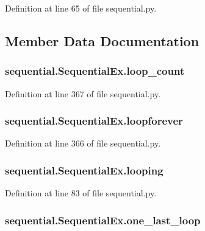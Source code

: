 Definition at line 65 of file sequential.\-py.



\subsection{Member Data Documentation}
\hypertarget{classsequential_1_1SequentialEx_a4ba41b6f01a147966df8df335d570d22}{
\subsubsection[{loop\-\_\-count}]{\setlength{\rightskip}{0pt plus 5cm}sequential.\-Sequential\-Ex.\-loop\-\_\-count}}\label{classsequential_1_1SequentialEx_a4ba41b6f01a147966df8df335d570d22}


Definition at line 367 of file sequential.\-py.

\hypertarget{classsequential_1_1SequentialEx_a8cf719781ed7aa81bb27e30d4281cb66}{
\subsubsection[{loopforever}]{\setlength{\rightskip}{0pt plus 5cm}sequential.\-Sequential\-Ex.\-loopforever}}\label{classsequential_1_1SequentialEx_a8cf719781ed7aa81bb27e30d4281cb66}


Definition at line 366 of file sequential.\-py.

\hypertarget{classsequential_1_1SequentialEx_a548a626b1a098a7ad2e0709fc97fa8f7}{
\subsubsection[{looping}]{\setlength{\rightskip}{0pt plus 5cm}sequential.\-Sequential\-Ex.\-looping}}\label{classsequential_1_1SequentialEx_a548a626b1a098a7ad2e0709fc97fa8f7}


Definition at line 83 of file sequential.\-py.

\hypertarget{classsequential_1_1SequentialEx_a3dbe6e22b44436f3fef2c114550ad8ca}{
\subsubsection[{one\-\_\-last\-\_\-loop}]{\setlength{\rightskip}{0pt plus 5cm}sequential.\-Sequential\-Ex.\-one\-\_\-last\-\_\-loop}}\label{classsequential_1_1SequentialEx_a3dbe6e22b44436f3fef2c114550ad8ca}



